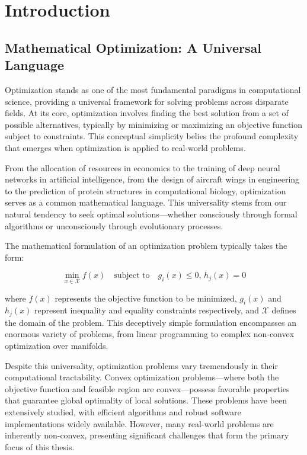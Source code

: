 
\chapter{Introduction}

\section{Mathematical Optimization: A Universal Language}

Optimization stands as one of the most fundamental paradigms in computational science, providing a universal framework for solving problems across disparate fields. At its core, optimization involves finding the best solution from a set of possible alternatives, typically by minimizing or maximizing an objective function subject to constraints. This conceptual simplicity belies the profound complexity that emerges when optimization is applied to real-world problems.

From the allocation of resources in economics to the training of deep neural networks in artificial intelligence, from the design of aircraft wings in engineering to the prediction of protein structures in computational biology, optimization serves as a common mathematical language. This universality stems from our natural tendency to seek optimal solutions—whether consciously through formal algorithms or unconsciously through evolutionary processes.

The mathematical formulation of an optimization problem typically takes the form:

\begin{equation}
\min_{x \in \mathcal{X}} f(x) \quad \text{subject to} \quad g_i(x) \leq 0, \, h_j(x) = 0
\end{equation}

where $f(x)$ represents the objective function to be minimized, $g_i(x)$ and $h_j(x)$ represent inequality and equality constraints respectively, and $\mathcal{X}$ defines the domain of the problem. This deceptively simple formulation encompasses an enormous variety of problems, from linear programming to complex non-convex optimization over manifolds.

Despite this universality, optimization problems vary tremendously in their computational tractability. Convex optimization problems—where both the objective function and feasible region are convex—possess favorable properties that guarantee global optimality of local solutions. These problems have been extensively studied, with efficient algorithms and robust software implementations widely available. However, many real-world problems are inherently non-convex, presenting significant challenges that form the primary focus of this thesis.

